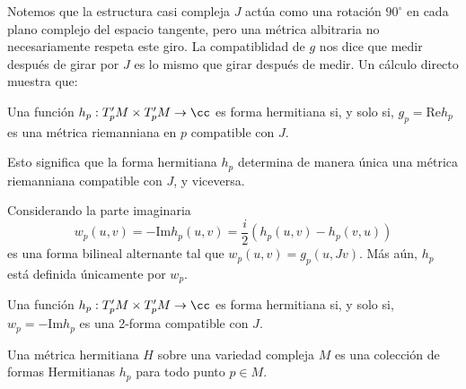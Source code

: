 Notemos que la estructura casi compleja $J$ actúa como una rotación $90^\circ$ en cada plano complejo del espacio tangente, pero una métrica albitraria no necesariamente respeta este giro. La compatiblidad de $g$ nos dice que medir después de girar por $J$ es lo mismo que girar después de medir. Un cálculo directo muestra que:
\begin{propo}
	Una función $h_p:T^\prime_pM\times T^\prime_pM\to\cc$ es forma hermitiana si, y solo si, $g_p=\mathrm{Re}h_p$ es una métrica riemanniana en $p$ compatible con $J$.
\end{propo}

Esto significa que la forma hermitiana $h_p$ determina de manera única una métrica riemanniana compatible con $J$, y viceversa. 

Considerando la parte imaginaria
\begin{equation*}
	w_p(u,v)=-\mathrm{Im}h_p(u,v)=\frac{i}{2}(h_p(u,v)-h_p(v,u))
\end{equation*}
es una forma bilineal alternante tal que $w_p(u,v)=g_p(u,Jv)$. Más aún, $h_p$ está definida únicamente por $w_p$.

\begin{propo}
	Una función $h_p:T^\prime_pM\times T^\prime_pM\to\cc$ es forma hermitiana si, y solo si, $w_p=-\mathrm{Im}h_p$ es una 2-forma compatible con $J$.	
\end{propo}

\begin{definition} 
	Una métrica hermitiana $H$ sobre una variedad compleja $M$ es una colección de formas Hermitianas $h_p$ para todo punto $p\in M$.
\end{definition}


